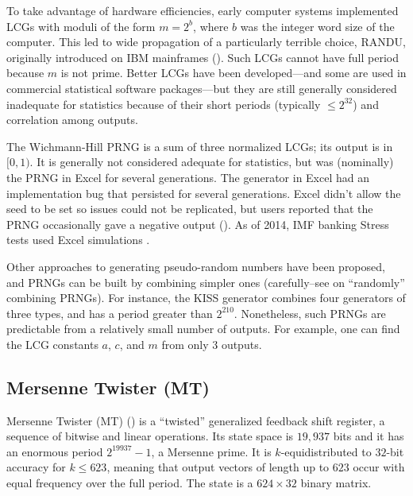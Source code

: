 \documentclass[graybox]{svmult}
\begin{document}
To take advantage of hardware efficiencies, early computer systems implemented LCGs 
with moduli of the form 
$m = 2^b$, where
$b$ was the integer word size of the computer.
This led to wide propagation of a particularly terrible choice, RANDU, originally introduced
on IBM mainframes (\cite{knuth_art_1997,markowsky14}).
Such LCGs cannot have full period because $m$ is not prime. 
Better LCGs have been developed---and some are used in commercial statistical software packages---but they are still
generally considered inadequate for statistics because of their short periods (typically $ \le 2^{32}$) 
and correlation among outputs.

The Wichmann-Hill PRNG is a sum of three normalized LCGs; its output is in $[0, 1)$.
%
It is generally not considered adequate for statistics, but was (nominally) the PRNG in Excel for several generations. 
The generator in Excel had an implementation bug that persisted for several generations.
Excel didn't allow the seed to be set so issues could not be replicated, but users reported that the PRNG occasionally gave a negative output (\cite{mccullough_microsoft_2008}).
As of 2014, IMF banking Stress tests used Excel simulations \cite{ong14}.

Other approaches to generating pseudo-random numbers have been
proposed, and PRNGs can be built by combining simpler ones (carefully--see \cite{knuth_art_1997} on ``randomly'' combining PRNGs).
For instance, the KISS generator combines four generators of three types, and has a period greater than $2^{210}$.
Nonetheless, such PRNGs are predictable from a relatively small number of outputs.
For example, one can find the LCG constants $a$, $c$, and $m$ from only 3 outputs.


\subsection{Mersenne Twister (MT)}

Mersenne Twister (MT) (\cite{matsumoto_mersenne_1998}) is a ``twisted'' generalized feedback shift register, a sequence of bitwise and linear operations.
Its state space is $19,937$ bits and it has an enormous period $2^{19937}-1$, a Mersenne prime.
It is $k$-equidistributed to $32$-bit accuracy for $k \leq 623$, 
meaning that output vectors of length up to $623$ occur with equal frequency over the full period.
The state is a $624 \times 32$ binary matrix.
\end{document}
